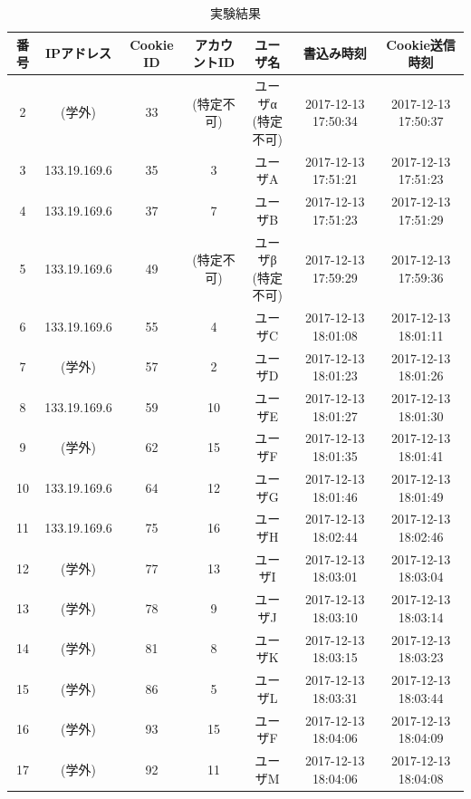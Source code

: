 \documentclass[10pt, a4paper]{jreport}
\begin{document}
\begin{table}[H]
	\caption{実験結果}
	\label{tb: exp_result}
	\begin{center}
		\scalebox{0.85} {
			\begin{tabular}{ | c | c | c | c | c | c | c | } \hline

番号 & IPアドレス & Cookie ID & アカウントID & ユーザ名 & 書込み時刻 & Cookie送信時刻 \\ \hline
2 & (学外) & 33 & (特定不可) & \shortstack{ユーザα\\(特定不可)} & 2017-12-13 17:50:34 & 2017-12-13 17:50:37 \\ \hline
3 & 133.19.169.6 & 35 & 3 & ユーザA & 2017-12-13 17:51:21 & 2017-12-13 17:51:23 \\ \hline
4 & 133.19.169.6 & 37 & 7 & ユーザB & 2017-12-13 17:51:23 & 2017-12-13 17:51:29 \\ \hline
5 & 133.19.169.6 & 49 & (特定不可) & \shortstack{ユーザβ\\(特定不可)} & 2017-12-13 17:59:29 & 2017-12-13 17:59:36 \\ \hline
6 & 133.19.169.6 & 55 & 4 & ユーザC & 2017-12-13 18:01:08 & 2017-12-13 18:01:11 \\ \hline
7 & (学外) & 57 & 2 & ユーザD & 2017-12-13 18:01:23 & 2017-12-13 18:01:26 \\ \hline
8 & 133.19.169.6 & 59 & 10 & ユーザE & 2017-12-13 18:01:27 & 2017-12-13 18:01:30 \\ \hline
9 & (学外) & 62 & 15 & ユーザF & 2017-12-13 18:01:35 & 2017-12-13 18:01:41 \\ \hline
10 & 133.19.169.6 & 64 & 12 & ユーザG & 2017-12-13 18:01:46 & 2017-12-13 18:01:49 \\ \hline
11 & 133.19.169.6 & 75 & 16 & ユーザH & 2017-12-13 18:02:44 & 2017-12-13 18:02:46 \\ \hline
12 & (学外) & 77 & 13 & ユーザI & 2017-12-13 18:03:01 & 2017-12-13 18:03:04 \\ \hline
13 & (学外) & 78 & 9 & ユーザJ & 2017-12-13 18:03:10 & 2017-12-13 18:03:14 \\ \hline
14 & (学外) & 81 & 8 & ユーザK & 2017-12-13 18:03:15 & 2017-12-13 18:03:23 \\ \hline
15 & (学外) & 86 & 5 & ユーザL & 2017-12-13 18:03:31 & 2017-12-13 18:03:44 \\ \hline
16 & (学外) & 93 & 15 & ユーザF & 2017-12-13 18:04:06 & 2017-12-13 18:04:09 \\ \hline
17 & (学外) & 92 & 11 & ユーザM & 2017-12-13 18:04:06 & 2017-12-13 18:04:08 \\ \hline

\end{tabular}}
\end{center}
\end{table}
\end{document}
